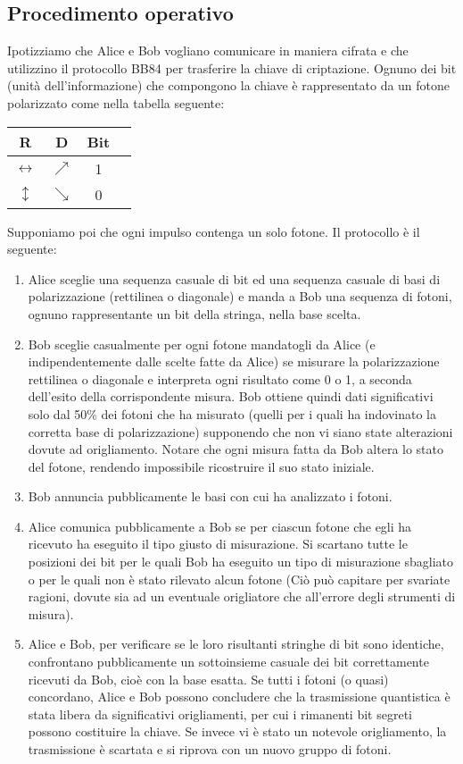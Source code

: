 \documentclass[italian,A4,12pt]{article}
\begin{document}
    \subsection{Procedimento operativo}
    Ipotizziamo che Alice e Bob vogliano comunicare in maniera cifrata e che utilizzino il protocollo BB84 per trasferire la chiave di criptazione. Ognuno dei bit (unità dell'informazione) che compongono la chiave è rappresentato da un fotone polarizzato come nella tabella seguente:
    \begin{center}
    \begin{tabular}{ |c|c|c|c| }
    \hline
    R & D & Bit \\
    \hline
    $\leftrightarrow$ & $\nearrow$ & 1 \\
    $\updownarrow$ & $\searrow$ & 0 \\
    \hline
    \end{tabular}
    \end{center}
    Supponiamo poi che ogni impulso contenga un solo fotone.
    Il protocollo è il seguente:
    \begin{enumerate}
      \item Alice sceglie una sequenza casuale di bit ed una sequenza casuale di basi di polarizzazione (rettilinea o diagonale) e manda a Bob una sequenza di fotoni, ognuno rappresentante un bit della stringa, nella base scelta.
      \item Bob sceglie casualmente per ogni fotone mandatogli da Alice (e indipendentemente dalle scelte fatte da Alice) se misurare la polarizzazione rettilinea o diagonale e interpreta ogni risultato come 0 o 1, a seconda dell'esito della corrispondente misura. Bob ottiene quindi dati significativi solo dal 50\% dei fotoni che ha misurato (quelli per i quali ha indovinato la  corretta base di polarizzazione) supponendo che non vi siano state alterazioni dovute ad origliamento.
      Notare che ogni misura fatta da Bob altera lo stato del fotone, rendendo impossibile ricostruire il suo stato iniziale.
      \item Bob annuncia pubblicamente le basi con cui ha analizzato i fotoni.
      \item Alice comunica pubblicamente a Bob se per ciascun fotone che egli ha ricevuto ha eseguito il tipo giusto di misurazione. Si scartano tutte le posizioni dei bit per le quali Bob ha eseguito un tipo di misurazione sbagliato o per le quali non è stato rilevato alcun fotone (Ciò può capitare per svariate ragioni, dovute sia ad un eventuale origliatore che all'errore degli strumenti di misura).
      \item Alice e Bob, per verificare se le loro risultanti stringhe di bit sono identiche, confrontano pubblicamente un sottoinsieme casuale dei bit correttamente ricevuti da Bob, cioè con la base esatta. Se tutti i fotoni (o quasi) concordano, Alice e Bob possono concludere che la trasmissione quantistica è stata libera da significativi origliamenti, per cui i rimanenti bit segreti possono costituire la chiave. Se invece vi è stato un notevole origliamento, la trasmissione è scartata e si riprova con un nuovo gruppo di fotoni.
    \end{enumerate}
\end{document}
